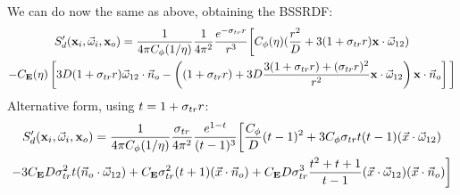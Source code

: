 \documentclass[10pt,a4paper]{article}
\begin{document}
We can do now the same as above, obtaining the BSSRDF:
\begin{multline*}
S_d'(\mathbf{x}_i, \vec{\omega}_i, \mathbf{x}_o)  = \frac{1}{4\pi C_{\phi}(1/\eta)} \frac{1}{4 \pi^2} \frac{e^{-\sigma_{tr} r}}{r^3} \bigg[ C_{\phi}(\eta) (\frac{r^2}{D} +  3 (1 + \sigma_{tr} r) \mathbf{x}\cdot\vec{\omega}_{12} ) \\ - C_{\mathbf{E}}(\eta) \left[3D (1 + \sigma_{tr} r) \vec{\omega}_{12} \cdot \vec{n}_o - \left((1 + \sigma_{tr} r) + 3D \frac{3 (1 + \sigma_{tr} r)  + (\sigma_{tr} r)^2}{r^2}\mathbf{x}\cdot\vec{\omega}_{12}\right) \mathbf{x} \cdot \vec{n}_o\right] \bigg]
\end{multline*}
Alternative form, using $t = 1 + \sigma_{tr} r$:
\begin{multline*}
S_d'(\mathbf{x}_i, \vec{\omega}_i, \mathbf{x}_o)  = \frac{1}{4\pi C_{\phi}(1/\eta)} \frac{\sigma_{tr}}{4 \pi^2} \frac{e^{1-t}}{(t-1)^3} \bigg[\frac{C_{\phi}}{D}(t-1)^2+ 3 C_{\phi} \sigma_{tr}  t (t-1) (\vec{x} \cdot  \vec{\omega}_{12}) \\- 3 C_{\mathbf{E}} D  \sigma_{tr}^2   t (\vec{n}_o \cdot  \vec{\omega}_{12}) + C_{\mathbf{E}} \sigma_{tr}^2  (t+1) (\vec{x} \cdot \vec{n}_o) + C_{\mathbf{E}}  D \sigma_{tr}^3  \frac{t^2+t+1}{t-1} (\vec{x} \cdot  \vec{\omega}_{12}) (\vec{x} \cdot \vec{n}_o)\bigg]
\end{multline*}
\end{document}

